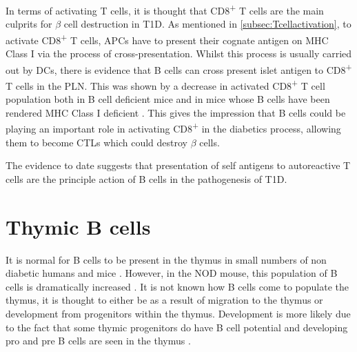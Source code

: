 In terms of activating T cells, it is thought that CD8\textsuperscript{+} T cells are the main culprits for $\beta$ cell destruction in T1D.
As mentioned in \cref{subsec:Tcellactivation}, to activate CD8\textsuperscript{+} T cells, APCs have to present their cognate antigen on MHC Class I via the process of cross-presentation.
Whilst this process is usually carried out by DCs, there is evidence that B cells can cross present islet antigen to CD8\textsuperscript{+} T cells in the PLN.
This was shown by a decrease in activated CD8\textsuperscript{+} T cell population both in B cell deficient mice and in mice whose B cells have been rendered MHC Class I deficient \citep{Marino2012}.
This gives the impression that B cells could be playing an important role in activating CD8\textsuperscript{+} in the diabetics process, allowing them to become CTLs which could destroy $\beta$ cells.

The evidence to date suggests that presentation of self antigens to autoreactive T cells are the principle action of B cells in the pathogenesis of T1D.






\section{Thymic B cells}
\label{sec:thymicBcells}
 
It is normal for B cells to be present in the thymus in small numbers \citep{Isaacson1987, Akashi2000, Miyama1988} of non diabetic humans \citep{Isaacson1987} and mice \citep{Akashi2000}. 
However, in the NOD mouse, this population of B cells is dramatically increased \citep{OReilly1994, Serreze1998}.
It is not known how B cells come to populate the thymus, it is thought to either be as a result of migration to the thymus or development from progenitors within the thymus.
Development is more likely due to the fact that some thymic progenitors do have B cell potential \citep{Porritt2004} and developing pro and pre B cells are seen in the thymus \citep{Akashi2000}.


